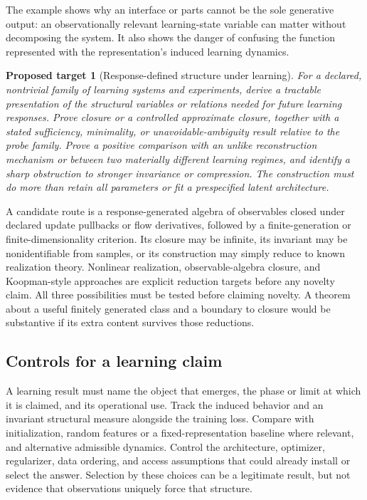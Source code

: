 \documentclass[11pt]{article}
\newtheorem{target}[definition]{Proposed target}
\theoremstyle{remark}
\begin{document}
The example shows why an interface or parts cannot be the sole generative output: an observationally relevant learning-state variable can matter without decomposing the system. It also shows the danger of confusing the function represented with the representation's induced learning dynamics.

\begin{target}[Response-defined structure under learning]
\label{target:learning}
For a declared, nontrivial family of learning systems and experiments, derive a tractable presentation of the structural variables or relations needed for future learning responses. Prove closure or a controlled approximate closure, together with a stated sufficiency, minimality, or unavoidable-ambiguity result relative to the probe family. Prove a positive comparison with an unlike reconstruction mechanism or between two materially different learning regimes, and identify a sharp obstruction to stronger invariance or compression. The construction must do more than retain all parameters or fit a prespecified latent architecture.
\end{target}

A candidate route is a response-generated algebra of observables closed under declared update pullbacks or flow derivatives, followed by a finite-generation or finite-dimensionality criterion. Its closure may be infinite, its invariant may be nonidentifiable from samples, or its construction may simply reduce to known realization theory. Nonlinear realization, observable-algebra closure, and Koopman-style approaches are explicit reduction targets before any novelty claim. All three possibilities must be tested before claiming novelty. A theorem about a useful finitely generated class and a boundary to closure would be substantive if its extra content survives those reductions.

\subsection{Controls for a learning claim}

A learning result must name the object that emerges, the phase or limit at which it is claimed, and its operational use. Track the induced behavior and an invariant structural measure alongside the training loss. Compare with initialization, random features or a fixed-representation baseline where relevant, and alternative admissible dynamics. Control the architecture, optimizer, regularizer, data ordering, and access assumptions that could already install or select the answer. Selection by these choices can be a legitimate result, but not evidence that observations uniquely force that structure.
\end{document}
